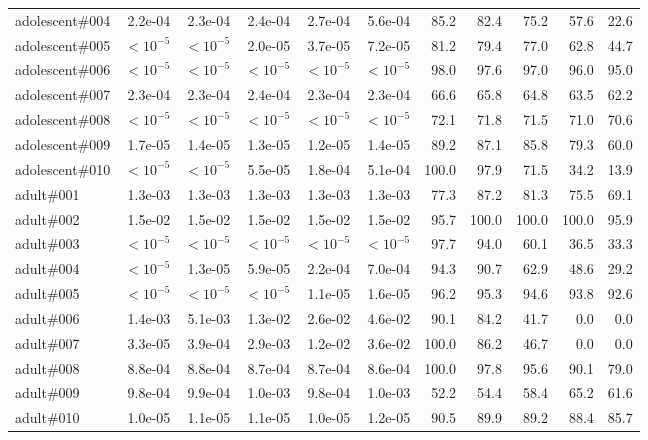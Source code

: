 \begin{table}[H]
\begin{tabular}{lrrrrrrrrrr}
adolescent\#004 & 2.2e-04 & 2.3e-04 & 2.4e-04 & 2.7e-04 & 5.6e-04 & 85.2 & 82.4 & 75.2 & 57.6 & 22.6 \\
adolescent\#005 & $<10^{-5}$ & $<10^{-5}$ & 2.0e-05 & 3.7e-05 & 7.2e-05 & 81.2 & 79.4 & 77.0 & 62.8 & 44.7 \\
adolescent\#006 & $<10^{-5}$ & $<10^{-5}$ & $<10^{-5}$ & $<10^{-5}$ & $<10^{-5}$ & 98.0 & 97.6 & 97.0 & 96.0 & 95.0 \\
adolescent\#007 & 2.3e-04 & 2.3e-04 & 2.4e-04 & 2.3e-04 & 2.3e-04 & 66.6 & 65.8 & 64.8 & 63.5 & 62.2 \\
adolescent\#008 & $<10^{-5}$ & $<10^{-5}$ & $<10^{-5}$ & $<10^{-5}$ & $<10^{-5}$ & 72.1 & 71.8 & 71.5 & 71.0 & 70.6 \\
adolescent\#009 & 1.7e-05 & 1.4e-05 & 1.3e-05 & 1.2e-05 & 1.4e-05 & 89.2 & 87.1 & 85.8 & 79.3 & 60.0 \\
adolescent\#010 & $<10^{-5}$ & $<10^{-5}$ & 5.5e-05 & 1.8e-04 & 5.1e-04 & 100.0 & 97.9 & 71.5 & 34.2 & 13.9 \\
adult\#001 & 1.3e-03 & 1.3e-03 & 1.3e-03 & 1.3e-03 & 1.3e-03 & 77.3 & 87.2 & 81.3 & 75.5 & 69.1 \\
adult\#002 & 1.5e-02 & 1.5e-02 & 1.5e-02 & 1.5e-02 & 1.5e-02 & 95.7 & 100.0 & 100.0 & 100.0 & 95.9 \\
adult\#003 & $<10^{-5}$ & $<10^{-5}$ & $<10^{-5}$ & $<10^{-5}$ & $<10^{-5}$ & 97.7 & 94.0 & 60.1 & 36.5 & 33.3 \\
adult\#004 & $<10^{-5}$ & 1.3e-05 & 5.9e-05 & 2.2e-04 & 7.0e-04 & 94.3 & 90.7 & 62.9 & 48.6 & 29.2 \\
adult\#005 & $<10^{-5}$ & $<10^{-5}$ & $<10^{-5}$ & 1.1e-05 & 1.6e-05 & 96.2 & 95.3 & 94.6 & 93.8 & 92.6 \\
adult\#006 & 1.4e-03 & 5.1e-03 & 1.3e-02 & 2.6e-02 & 4.6e-02 & 90.1 & 84.2 & 41.7 & 0.0 & 0.0 \\
adult\#007 & 3.3e-05 & 3.9e-04 & 2.9e-03 & 1.2e-02 & 3.6e-02 & 100.0 & 86.2 & 46.7 & 0.0 & 0.0 \\
adult\#008 & 8.8e-04 & 8.8e-04 & 8.7e-04 & 8.7e-04 & 8.6e-04 & 100.0 & 97.8 & 95.6 & 90.1 & 79.0 \\
adult\#009 & 9.8e-04 & 9.9e-04 & 1.0e-03 & 9.8e-04 & 1.0e-03 & 52.2 & 54.4 & 58.4 & 65.2 & 61.6 \\
adult\#010 & 1.0e-05 & 1.1e-05 & 1.1e-05 & 1.0e-05 & 1.2e-05 & 90.5 & 89.9 & 89.2 & 88.4 & 85.7 \\
\bottomrule
\end{tabular}
\end{table}


